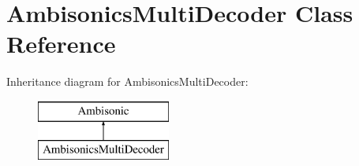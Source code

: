 \hypertarget{class_ambisonics_multi_decoder}{\section{Ambisonics\-Multi\-Decoder Class Reference}
\label{class_ambisonics_multi_decoder}
}
Inheritance diagram for Ambisonics\-Multi\-Decoder\-:\begin{figure}[H]
\begin{center}
\leavevmode
\includegraphics[height=2.000000cm]{class_ambisonics_multi_decoder}
\end{center}
\end{figure}
